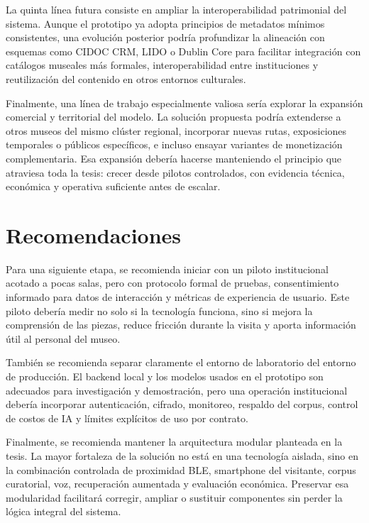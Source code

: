 La quinta línea futura consiste en ampliar la interoperabilidad patrimonial del sistema. Aunque el prototipo ya adopta principios de metadatos mínimos consistentes, una evolución posterior podría profundizar la alineación con esquemas como CIDOC CRM, LIDO o Dublin Core para facilitar integración con catálogos museales más formales, interoperabilidad entre instituciones y reutilización del contenido en otros entornos culturales.

Finalmente, una línea de trabajo especialmente valiosa sería explorar la expansión comercial y territorial del modelo. La solución propuesta podría extenderse a otros museos del mismo clúster regional, incorporar nuevas rutas, exposiciones temporales o públicos específicos, e incluso ensayar variantes de monetización complementaria. Esa expansión debería hacerse manteniendo el principio que atraviesa toda la tesis: crecer desde pilotos controlados, con evidencia técnica, económica y operativa suficiente antes de escalar.

\section{Recomendaciones}

Para una siguiente etapa, se recomienda iniciar con un piloto institucional acotado a pocas salas, pero con protocolo formal de pruebas, consentimiento informado para datos de interacción y métricas de experiencia de usuario. Este piloto debería medir no solo si la tecnología funciona, sino si mejora la comprensión de las piezas, reduce fricción durante la visita y aporta información útil al personal del museo.

También se recomienda separar claramente el entorno de laboratorio del entorno de producción. El backend local y los modelos usados en el prototipo son adecuados para investigación y demostración, pero una operación institucional debería incorporar autenticación, cifrado, monitoreo, respaldo del corpus, control de costos de IA y límites explícitos de uso por contrato.

Finalmente, se recomienda mantener la arquitectura modular planteada en la tesis. La mayor fortaleza de la solución no está en una tecnología aislada, sino en la combinación controlada de proximidad BLE, smartphone del visitante, corpus curatorial, voz, recuperación aumentada y evaluación económica. Preservar esa modularidad facilitará corregir, ampliar o sustituir componentes sin perder la lógica integral del sistema.

